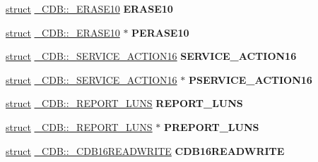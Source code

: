 \begin{DoxyCompactItemize}
\item 
\mbox{\label{union___c_d_b_aa606f4364841d8ffb01d1280dd71ab53}} 
\hyperlink{interfacestruct}{struct} \hyperlink{struct___c_d_b_1_1___e_r_a_s_e10}{\+\_\+\+C\+D\+B\+::\+\_\+\+E\+R\+A\+S\+E10} {\bfseries E\+R\+A\+S\+E10}
\item 
\mbox{\label{union___c_d_b_a43fce0f4368276f42d63693e0c7b9d05}} 
\hyperlink{interfacestruct}{struct} \hyperlink{struct___c_d_b_1_1___e_r_a_s_e10}{\+\_\+\+C\+D\+B\+::\+\_\+\+E\+R\+A\+S\+E10} $\ast$ {\bfseries P\+E\+R\+A\+S\+E10}
\item 
\mbox{\label{union___c_d_b_a1054cfc4e4dedf208fa11d50782d0d79}} 
\hyperlink{interfacestruct}{struct} \hyperlink{struct___c_d_b_1_1___s_e_r_v_i_c_e___a_c_t_i_o_n16}{\+\_\+\+C\+D\+B\+::\+\_\+\+S\+E\+R\+V\+I\+C\+E\+\_\+\+A\+C\+T\+I\+O\+N16} {\bfseries S\+E\+R\+V\+I\+C\+E\+\_\+\+A\+C\+T\+I\+O\+N16}
\item 
\mbox{\label{union___c_d_b_ab3f09c2e1e537419c5400b1397e2078d}} 
\hyperlink{interfacestruct}{struct} \hyperlink{struct___c_d_b_1_1___s_e_r_v_i_c_e___a_c_t_i_o_n16}{\+\_\+\+C\+D\+B\+::\+\_\+\+S\+E\+R\+V\+I\+C\+E\+\_\+\+A\+C\+T\+I\+O\+N16} $\ast$ {\bfseries P\+S\+E\+R\+V\+I\+C\+E\+\_\+\+A\+C\+T\+I\+O\+N16}
\item 
\mbox{\label{union___c_d_b_ae0c29ffb892d9c2519d7859be7b4d4e8}} 
\hyperlink{interfacestruct}{struct} \hyperlink{struct___c_d_b_1_1___r_e_p_o_r_t___l_u_n_s}{\+\_\+\+C\+D\+B\+::\+\_\+\+R\+E\+P\+O\+R\+T\+\_\+\+L\+U\+NS} {\bfseries R\+E\+P\+O\+R\+T\+\_\+\+L\+U\+NS}
\item 
\mbox{\label{union___c_d_b_a20cc6f1c2ab6ac5cb4adedbb43229829}} 
\hyperlink{interfacestruct}{struct} \hyperlink{struct___c_d_b_1_1___r_e_p_o_r_t___l_u_n_s}{\+\_\+\+C\+D\+B\+::\+\_\+\+R\+E\+P\+O\+R\+T\+\_\+\+L\+U\+NS} $\ast$ {\bfseries P\+R\+E\+P\+O\+R\+T\+\_\+\+L\+U\+NS}
\item 
\mbox{\label{union___c_d_b_a1a0353592511a856baceebf76357ec4f}} 
\hyperlink{interfacestruct}{struct} \hyperlink{struct___c_d_b_1_1___c_d_b16_r_e_a_d_w_r_i_t_e}{\+\_\+\+C\+D\+B\+::\+\_\+\+C\+D\+B16\+R\+E\+A\+D\+W\+R\+I\+TE} {\bfseries C\+D\+B16\+R\+E\+A\+D\+W\+R\+I\+TE}

\end{DoxyCompactItemize}
